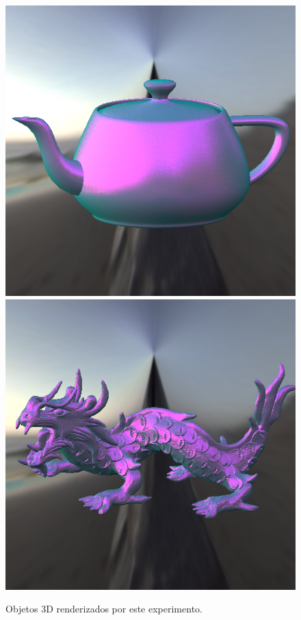 \begin{figure}[H]
    \caption{\small{Objetos 3D renderizados por este experimento.}}
    \label{fig-blinn-phong-eqlang}
  \includegraphics[width=\linewidth]{./Imagens/brdfs/blinn-phong-teapot.png}
\endminipage\hfill
{}
  \includegraphics[width=\linewidth]{./Imagens/brdfs/blinn-phong-dragon.png}

\end{figure}
